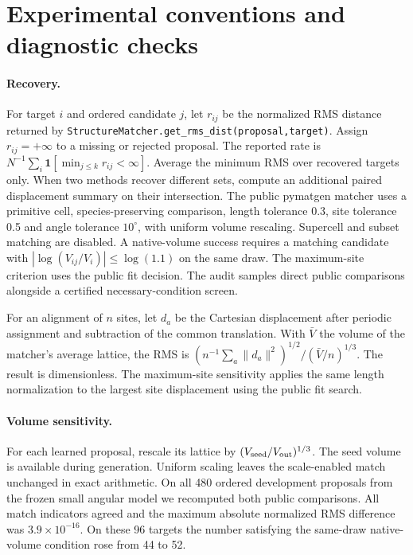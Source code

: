 \section{Experimental conventions and diagnostic checks}\label{app:benchmark-conventions}
\paragraph{Recovery.} For target $i$ and ordered candidate $j$, let $r_{ij}$ be the normalized RMS distance returned by \texttt{StructureMatcher.get\_rms\_dist(proposal,target)}. Assign $r_{ij}=+\infty$ to a missing or rejected proposal. The reported rate is $N^{-1}\sum_i\mathbf{1}[\min_{j\leq k}r_{ij}<\infty]$. Average the minimum RMS over recovered targets only. When two methods recover different sets, compute an additional paired displacement summary on their intersection. The public pymatgen matcher \cite{pymatgen} uses a primitive cell, species-preserving comparison, length tolerance 0.3, site tolerance 0.5 and angle tolerance $10^\circ$, with uniform volume rescaling. Supercell and subset matching are disabled. A native-volume success requires a matching candidate with $|\log(V_{ij}/V_i)|\leq\log(1.1)$ on the same draw. The maximum-site criterion uses the public fit decision. The audit samples direct public comparisons alongside a certified necessary-condition screen.

For an alignment of $n$ sites, let $d_a$ be the Cartesian displacement after periodic assignment and subtraction of the common translation. With $\bar V$ the volume of the matcher's average lattice, the RMS is $(n^{-1}\sum_a\|d_a\|^2)^{1/2}/(\bar V/n)^{1/3}$. The result is dimensionless. The maximum-site sensitivity applies the same length normalization to the largest site displacement using the public fit search.

\paragraph{Volume sensitivity.} For each learned proposal, rescale its lattice by $(V_{\rm seed}/V_{\rm out})^{1/3}$. The seed volume is available during generation. Uniform scaling leaves the scale-enabled match unchanged in exact arithmetic. On all 480 ordered development proposals from the frozen small angular model we recomputed both public comparisons. All match indicators agreed and the maximum absolute normalized RMS difference was $3.9\times10^{-16}$. On these 96 targets the number satisfying the same-draw native-volume condition rose from 44 to 52.

